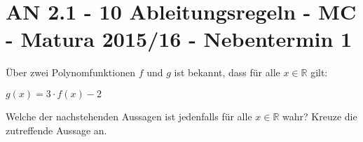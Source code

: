 \section{AN 2.1 - 10 Ableitungsregeln - MC - Matura 2015/16 - Nebentermin 1}

\begin{beispiel}[AN 2.1]{1} %
Über zwei Polynomfunktionen $f$ und $g$ ist bekannt, dass für alle $x\in \mathbb{R}$ gilt: 

$g(x)=3\cdot f(x)-2$ \leer

Welche der nachstehenden Aussagen ist jedenfalls für alle $x\in \mathbb{R}$ wahr? Kreuze die zutreffende Aussage an. 

\end{beispiel}